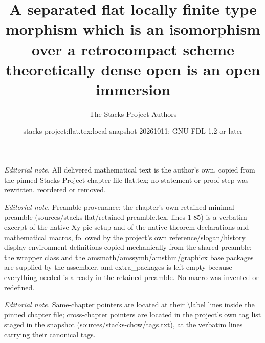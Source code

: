 \documentclass[10pt,a4paper]{amsart}
\title{A separated flat locally finite type morphism which is an isomorphism over a retrocompact scheme theoretically dense open is an open immersion}
\author{The Stacks Project Authors}
\date{stacks-project:flat.tex:local-snapshot-20261011; GNU FDL 1.2 or later}
\theoremstyle{plain}
\theoremstyle{definition}
\theoremstyle{remark}
\numberwithin{equation}{subsection}
\begin{document}
\maketitle
\noindent\textit{Editorial note.} All delivered mathematical text is the author's own, copied from the pinned Stacks Project chapter file flat.tex; no statement or proof step was rewritten, reordered or removed.\par\medskip
\noindent\textit{Editorial note.} Preamble provenance: the chapter's own retained minimal preamble (sources/stacks-flat/retained-preamble.tex, lines 1-85) is a verbatim excerpt of the native Xy-pic setup and of the native theorem declarations and mathematical macros, followed by the project's own reference/slogan/history display-environment definitions copied mechanically from the shared preamble; the wrapper class and the amsmath/amssymb/amsthm/graphicx base packages are supplied by the assembler, and extra\_packages is left empty because everything needed is already in the retained preamble. No macro was invented or redefined.\par\medskip
\noindent\textit{Editorial note.} Same-chapter pointers are located at their \textbackslash{}label lines inside the pinned chapter file; cross-chapter pointers are located in the project's own tag list staged in the snapshot (sources/stacks-chow/tags.txt), at the verbatim lines carrying their canonical tags.\par\medskip
\end{document}
